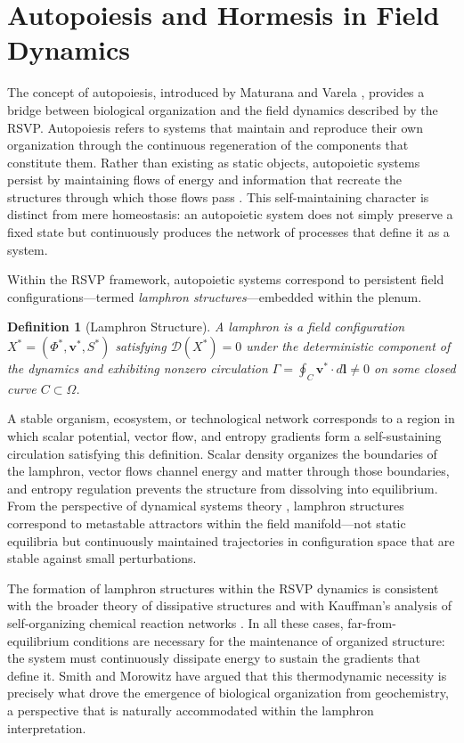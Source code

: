 \documentclass[12pt]{article}
\newtheorem{definition}{Definition}[section]
\begin{document}
\section{Autopoiesis and Hormesis in Field Dynamics}
\label{sec:autopoiesis}

The concept of autopoiesis, introduced by Maturana and Varela \cite{maturana1980}, provides a bridge between biological organization and the field dynamics described by the RSVP. Autopoiesis refers to systems that maintain and reproduce their own organization through the continuous regeneration of the components that constitute them. Rather than existing as static objects, autopoietic systems persist by maintaining flows of energy and information that recreate the structures through which those flows pass \cite{maturana1980,smithmorowitz2016}. This self-maintaining character is distinct from mere homeostasis: an autopoietic system does not simply preserve a fixed state but continuously produces the network of processes that define it as a system.

Within the RSVP framework, autopoietic systems correspond to persistent field configurations---termed \emph{lamphron structures}---embedded within the plenum.

\begin{definition}[Lamphron Structure]
A lamphron is a field configuration $X^* = (\Phi^*, \mathbf{v}^*, S^*)$ satisfying $\mathcal{D}(X^*) = 0$ under the deterministic component of the dynamics and exhibiting nonzero circulation $\Gamma = \oint_C \mathbf{v}^* \cdot d\mathbf{l} \neq 0$ on some closed curve $C \subset \Omega$.
\end{definition}

A stable organism, ecosystem, or technological network corresponds to a region in which scalar potential, vector flow, and entropy gradients form a self-sustaining circulation satisfying this definition. Scalar density organizes the boundaries of the lamphron, vector flows channel energy and matter through those boundaries, and entropy regulation prevents the structure from dissolving into equilibrium. From the perspective of dynamical systems theory \cite{strogatz1994}, lamphron structures correspond to metastable attractors within the field manifold---not static equilibria but continuously maintained trajectories in configuration space that are stable against small perturbations.

The formation of lamphron structures within the RSVP dynamics is consistent with the broader theory of dissipative structures \cite{prigogine1984} and with Kauffman's analysis of self-organizing chemical reaction networks \cite{kauffman1993}. In all these cases, far-from-equilibrium conditions are necessary for the maintenance of organized structure: the system must continuously dissipate energy to sustain the gradients that define it. Smith and Morowitz \cite{smithmorowitz2016} have argued that this thermodynamic necessity is precisely what drove the emergence of biological organization from geochemistry, a perspective that is naturally accommodated within the lamphron interpretation.
\end{document}
